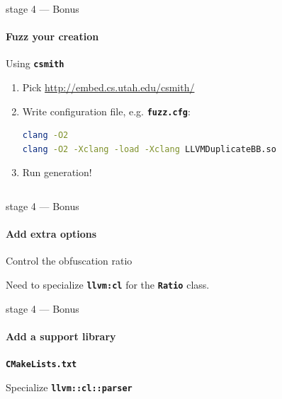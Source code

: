 \documentclass[14pt]{beamer}
\newcommand{\Command}[1]{\textbf{\texttt{#1}}}
\newcommand{\Code}[1]{\textbf{\texttt{#1}}}
\begin{document}
    \begin{frame}[containsverbatim]{stage 4 --- Bonus}
        \framesubtitle{Fuzz your creation}
        \begin{alertblock}{Using \Command{csmith}}
            \begin{enumerate}
                \item Pick \url{http://embed.cs.utah.edu/csmith/}
                \item Write configuration file, e.g. \Command{fuzz.cfg}:
                    {
                        \scriptsize
\begin{lstlisting}[language=bash]
clang -O2
clang -O2 -Xclang -load -Xclang LLVMDuplicateBB.so
\end{lstlisting}
                    }
                \item Run generation!
                    {
                        \scriptsize
\begin{lstlisting}[language=bash]
% CSMITH_HOME=$PWD ./scripts/compiler_test.pl 1000 fuzz.cfg
\end{lstlisting}
                    }
            \end{enumerate}
        \end{alertblock}
    \end{frame}

    \begin{frame}[containsverbatim]{stage 4 --- Bonus}
        \framesubtitle{Add extra options}
        \begin{alertblock}{Control the obfuscation ratio}
        {
        \scriptsize
        
        }
        \end{alertblock}
        \vspace{.1em}
        \structure{$\Rightarrow$} Need to specialize \Code{llvm:cl} for the \Code{Ratio} class.
    \end{frame}


    \begin{frame}{stage 4 --- Bonus}
        \framesubtitle{Add a support library}
        \begin{alertblock}{\Code{CMakeLists.txt}}
            \begin{minipage}{\textwidth}
            \scriptsize
            
            \end{minipage}
        \end{alertblock}

        \begin{alertblock}{Specialize \Code{llvm::cl::parser}}
            \begin{minipage}{\textwidth}
            \scriptsize
            
            \end{minipage}
        \end{alertblock}
    \end{frame}
\end{document}
